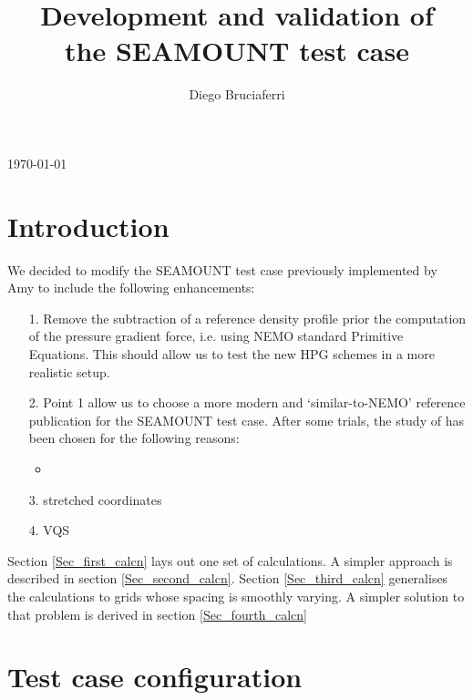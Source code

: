 \documentclass[authoryear]{elsarticle}
\begin{document}
\begin{frontmatter}

\title{Development and validation of \\ the SEAMOUNT test case}

\author{Diego Bruciaferri}
\address{Met Office, Fitzroy Rd, Exeter, UK }

\begin{abstract}
\end{abstract}

\end{frontmatter}


\today{}

\section{Introduction} 

We decided to modify the SEAMOUNT test case previously implemented by Amy to include the following enhancements:

\begin{itemize}
	\item[1.] Remove the subtraction of a reference density profile prior the computation of the pressure gradient force, i.e. using NEMO standard Primitive Equations. This should allow us to test the new HPG schemes in a more realistic setup.
	\item[2.] Point 1 allow us to choose a more modern and `similar-to-NEMO' reference publication for the SEAMOUNT test case. After some trials, the study of \cite{Ezer2002} has been chosen for the following reasons:
	\begin{itemize}
		\item  
    \end{itemize}
    \item[3.] stretched coordinates 
    \item[4.] VQS  
\end{itemize}

Section \ref{Sec_first_calcn} lays out one set of calculations. A simpler approach is described in section \ref{Sec_second_calcn}. 
Section \ref{Sec_third_calcn} generalises the calculations to grids whose spacing is smoothly varying. A simpler solution
to that problem is derived in section \ref{Sec_fourth_calcn}  

\section{Test case configuration} \label{config}
\end{document}
